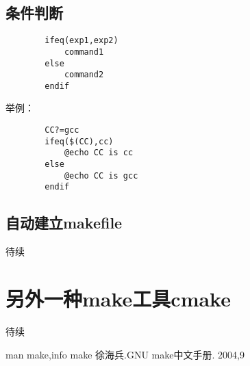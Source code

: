\documentclass{article}
\begin{document}
\begin{CJK}{UTF8}{gbsn}
	\subsection{条件判断}
	\begin{verbatim}
		ifeq(exp1,exp2)
		    command1
		else
		    command2
		endif
	\end{verbatim}
	举例：
	\begin{verbatim}
		CC?=gcc
		ifeq($(CC),cc)
		    @echo CC is cc 
		else
		    @echo CC is gcc
		endif
	\end{verbatim}
	\subsection{自动建立makefile}
		待续
\section{另外一种make工具cmake}
	待续 

\begin{thebibliography}{2}
	 man make,info make 
	 徐海兵.GNU make中文手册. 2004,9
\end{thebibliography}

\newpage
\listoftables	
\newpage
\printindex	

\end{CJK}
\end{document}
